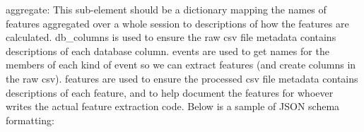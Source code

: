 {\ttfamily aggregate}\+: This sub-\/element should be a dictionary mapping the names of features aggregated over a whole session to descriptions of how the features are calculated. {\ttfamily db\+\_\+columns} is used to ensure the raw csv file metadata contains descriptions of each database column. {\ttfamily events} are used to get names for the members of each kind of event so we can extract features (and create columns in the raw csv). {\ttfamily features} are used to ensure the processed csv file metadata contains descriptions of each feature, and to help document the features for whoever writes the actual feature extraction code. Below is a sample of J\+S\+ON schema formatting\+: 
\begin{DoxyCode}{0}
\DoxyCodeLine{\{}
\DoxyCodeLine{    \},}
\DoxyCodeLine{}
\DoxyCodeLine{        \}}
\DoxyCodeLine{    \},}
\DoxyCodeLine{}
\DoxyCodeLine{        \},}
\DoxyCodeLine{        \},}
\DoxyCodeLine{        \}}
\DoxyCodeLine{    \}}
\DoxyCodeLine{\}}
\end{DoxyCode}



